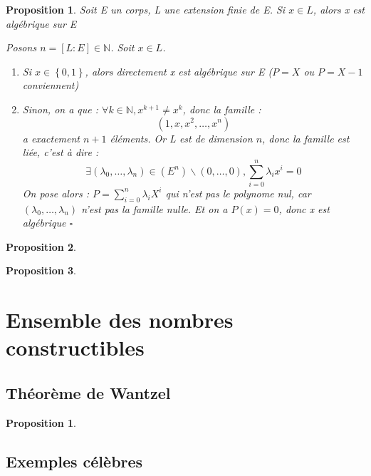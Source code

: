 \documentclass[a4paper,12pt,french]{report}
\newtheorem{proposition}{Proposition}[section]
\newtheorem{theorem}{Proposition}[section]
\begin{document}
			\begin{proposition}
				Soit E un corps, L une extension finie de E. Si \(x \in L\), alors x est algébrique sur E
				
				\begin{preuve}
					Posons \(n = [L:E] \in \mathbb{N} \). Soit \(x \in L \).{}
					\begin{enumerate}
						\item Si \(x \in \left\{ 0, 1\right\} \), alors directement x est algébrique sur E (\(P = X \) ou \(P = X - 1 \) conviennent)
						\item Sinon, on a que : \(\forall k \in \mathbb{N}, x^{k+1} \neq x^{k} \), donc la famille : 
						\[{}
						\left( 1 , x , x^{2} , \dots , x^{n} \right)
						\]
						a exactement \(n+1\) éléments. Or L est de dimension \(n\), donc la famille est liée, c'est à dire : 
						\[{}
							\exists (\lambda_{0},\dots,\lambda_{n}) \in (E^{n})\backslash {(0,\dots,0)}, \sum_{i = 0}^{n} \lambda_{i}x^{i} = 0
						\]
						On pose alors : \(P = \sum_{i = 0}^{n} \lambda_{i}X^{i} \) qui n'est pas le polynome nul, car \( (\lambda_{0},\dots,\lambda_{n}) \) n'est pas la famille nulle. Et on a \(P(x) = 0 \), donc x est algébrique  \(\square\)
					\end{enumerate}
				\end{preuve}
			\end{proposition}
			
			\begin{proposition}
			\end{proposition}
			
			\begin{proposition}
			\end{proposition}
		
	\section{Ensemble des nombres constructibles}
		\subsection{Théorème de Wantzel}
			\begin{theorem}
				
			\end{theorem}
			\begin{preuve}
				
			\end{preuve}
		
		\subsection{Exemples célèbres}
\end{document}
